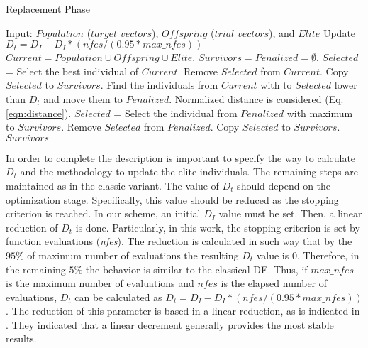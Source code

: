 \begin{algorithm}[t]
  \scriptsize
	\caption{Replacement Phase} \label{alg:Replacement}
	\begin{algorithmic}[1]
	\STATE Input: $Population$ ($target$ $vectors$), $Offspring$ ($trial$ $vectors$), and $Elite$
	\STATE Update $D_t = D_I - D_I *(nfes/(0.95*max\_nfes)) $ 
	\STATE $Current = Population \cup Offspring \cup Elite$.
	\STATE $Survivors = Penalized = \emptyset$.
	   \STATE $Selected$ = Select the best individual of $Current$.
		 \STATE Remove $Selected$ from $Current$.
	   \STATE Copy $Selected$ to $Survivors$.
	   \STATE Find the individuals from $Current$ with \DCN{} to $Selected$ lower than $D_t$ and move them to $Penalized$. Normalized distance is considered (Eq. \ref{eqn:distance}).
	\ENDWHILE
	   \STATE $Selected$ = Select the individual from $Penalized$ with maximum \DCN{} to $Survivors$.
		 \STATE Remove $Selected$ from $Penalized$.
	   \STATE Copy $Selected$ to $Survivors$.
	\ENDWHILE
  \RETURN $Survivors$
\end{algorithmic}
\end{algorithm}


In order to complete the description is important to specify the way to calculate $D_t$ and the methodology to update the 
elite individuals.
%
The remaining steps are maintained as in the classic \DE{} variant.
%
The value of $D_t$ should depend on the optimization stage.
%
Specifically, this value should be reduced as the stopping criterion is reached.
%
In our scheme, an initial $D_I$ value must be set.
%
Then, a linear reduction of $D_t$ is done.
%
Particularly, in this work, the stopping criterion is set by function evaluations (\textit{nfes}).
%
The reduction is calculated in such way that by the $95\%$ of maximum number of evaluations the resulting $D_t$ value is $0$.
%
Therefore, in the remaining $5\%$ the behavior is similar to the classical DE.
%
Thus, if $max\_nfes$ is the maximum number of evaluations and $nfes$ is the elapsed number of evaluations, $D_t$ can be calculated as $D_t=D_I - D_I *(nfes/(0.95*max\_nfes))$.
%
The reduction of this parameter is based in a linear reduction, as is indicated in \cite{segura2016novel}.
%
They indicated that a linear decrement generally provides the most stable results.

